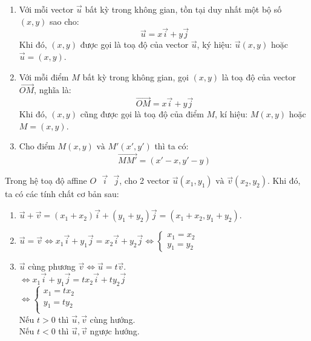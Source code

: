 \documentclass[12pt,a4]{article}
\begin{document}
\begin{titlepage}
\begin{enumerate}
\begin{center}
\begin{tikzpicture}[scale=2]
            \end{tikzpicture}
            \end{center}
        \item Với mỗi vector $\vec{u}$ bất kỳ trong không gian, tồn tại duy nhất một bộ số $(x,y)$ sao cho:
        \[
            \vec{u} = x\vec{i} + y\vec{j}
        \]
        Khi đó, $(x,y)$ được gọi là toạ độ của vector $\vec{u}$, ký hiệu: $\vec{u}(x,y)$ hoặc $\vec{u} = (x,y)$.
        \item Với mỗi điểm $M$ bất kỳ trong không gian, gọi $(x,y)$ là toạ độ của vector $\overrightarrow{OM}$, nghĩa là:
        \[
            \overrightarrow{OM} = x\vec{i} + y\vec{j}
        \]
        Khi đó, $(x,y)$ cũng được gọi là toạ độ của điểm $M$, kí hiệu: $M(x,y)$ hoặc $M = (x,y)$.
        \item Cho điểm $M(x,y) \text{ và } M'(x',y')$ thì ta có:
        \[
            \overrightarrow{MM'} = (x' - x, y' - y)
        \]
    \end{enumerate} 
    Trong hệ toạ độ affine $O\text{ }\vec{i}\text{ }\vec{j}$, cho 2 vector $\vec{u}(x_1,y_1) \text{ và } \vec{v}(x_2,y_2).$ Khi đó, ta có các tính chất cơ bản sau:\\
    \begin{enumerate}
        \item $\vec{u} + \vec{v} = (x_1 + x_2)\vec{i} + (y_1 + y_2)\vec{j} = (x_1 + x_2, y_1 + y_2).$
        \item $\vec{u} = \vec{v} \Leftrightarrow x_1\vec{i} + y_1\vec{j} = x_2\vec{i} + y_2\vec{j} \Leftrightarrow \begin{cases}
            x_1 = x_2\\
            y_1 = y_2
        \end{cases}$
        \item $\vec{u}$ cùng phương $\vec{v} \Leftrightarrow \vec{u} = t\vec{v}.$\\
        $\Leftrightarrow x_1 \vec{i} + y_1\vec{j} = tx_2\vec{i} + ty_2\vec{j}$\\
        $\Leftrightarrow \begin{cases}
            x_1 = tx_2\\
            y_1 = ty_2\\
        \end{cases}$\\
        Nếu $t > 0$ thì $\vec{u},\vec{v}$ cùng hướng.\\
        Nếu $t < 0$ thì $\vec{u},\vec{v}$ ngược hướng.
    \end{enumerate}

\end{titlepage}
\end{document}
